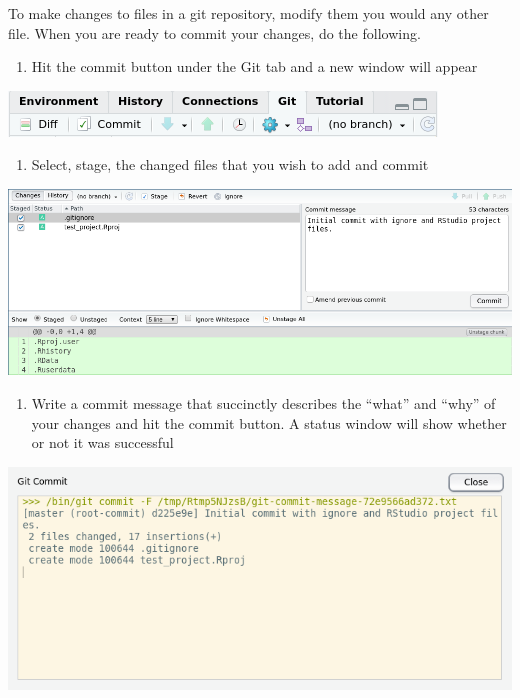 \documentclass[
]{book}
\providecommand{\tightlist}{%
  \setlength{\itemsep}{0pt}\setlength{\parskip}{0pt}}
\begin{document}
To make changes to files in a git repository, modify them you would any other file. When you are ready to commit your changes, do the following.

\begin{enumerate}
\def\labelenumi{\arabic{enumi}.}
\tightlist
\item
  Hit the commit button under the Git tab and a new window will appear
\end{enumerate}

\includegraphics{images/02-commit_1.png}

\begin{enumerate}
\def\labelenumi{\arabic{enumi}.}
\setcounter{enumi}{1}
\tightlist
\item
  Select, stage, the changed files that you wish to add and commit
\end{enumerate}

\includegraphics{images/02-commit_2.png}

\begin{enumerate}
\def\labelenumi{\arabic{enumi}.}
\setcounter{enumi}{2}
\tightlist
\item
  Write a commit message that succinctly describes the ``what'' and ``why'' of your changes and hit the commit button. A status window will show whether or not it was successful
\end{enumerate}

\includegraphics{images/02-commit_3.png}
\end{document}
